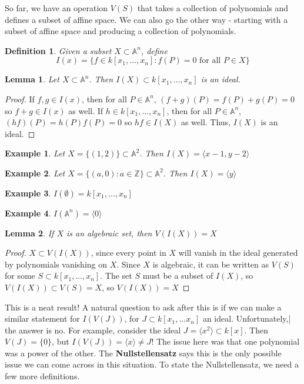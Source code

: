 \documentclass{article}
\newtheorem{definition}{Definition}[section]
\newtheorem{exmp}{Example}[section]
\newtheorem{lemma}{Lemma}[section]
\begin{document}
So far, we have an operation $V(S)$ that takes a collection of polynomials and defines a subset of affine space. We can also go the other way - starting with a subset of affine space
and producing a collection of polynomials.

\begin{definition}
    Given a subset $X \subset \mathbb{A}^n$, define \[ I(x) = \{ f \in k[x_1, \ldots, x_n] : f(P) = 0 \text{ for all } P \in X\}\]


\end{definition}

\begin{lemma}
    Let $X \subset \mathbb{A}^n$. Then $I(X) \subset k[x_1, \ldots, x_n]$ is an ideal.
\end{lemma}
\begin{proof}
If $f, g  \in I(x)$, then for all $P \in \mathbb{A}^n$, \( (f+g)(P) = f(P) + g(P) = 0 \) so $f + g \in I(x)$ as well. If $h \in k[x_1, \ldots , x_n]$, then for all $P \in \mathbb{A}^n$,
\( (hf)(P) = h(P)f(P) = 0 \) so $hf \in I(X)$ as well. Thus, $I(X)$ is an ideal.

\end{proof}

\begin{exmp}
    Let $X = \{(1, 2)\} \subset \mathbb{A}^2$. Then $I(X) = \langle x-1, y-2 \rangle$
\end{exmp}
    
\begin{exmp}
    Let $X = \{ (a, 0) : a \in \mathbb{Z} \} \subset \mathbb{A}^2$. Then $I(X) = \langle y \rangle$
\end{exmp}

\begin{exmp}
    \( I(\emptyset) = k[x_1, \ldots, x_n]\)
\end{exmp}

\begin{exmp}
    \( I(\mathbb{A}^n) = \langle 0 \rangle \)
\end{exmp}

\begin{lemma}
    If $X$ is an algebraic set, then $V(I(X)) = X$
\end{lemma}
\begin{proof}
    $X \subset V(I(X))$, since every point in $X$ will vanish in the ideal generated by polynomials vanishing on $X$. Since $X$ is algebraic, it can be written as  $V(S)$ for some 
    $S \subset k[x_1, \ldots, x_n]$. The set $S$ must be a subset of $I(X)$, so $V(I(X)) \subset V(S) = X$, so $V(I(X)) = X$ 
\end{proof} This is a neat result! A natural question to ask after this is if we can make a similar statement for $I(V(J))$, for $J \subset k[x_1, \ldots x_n]$ an ideal. Unfortunately,|
the answer is no. For example, consider the ideal $J = \langle x^2 \rangle \subset k[x]$. Then $V(J) = \{ 0 \}$, but $I(V(J)) = \langle x \rangle \neq J$! The issue here was that one polynomial
was a power of the other. The \textbf{Nullstellensatz} says this is the only possible issue we can come across in this situation. To state the Nullstellensatz, we need a few more definitions.
\end{document}
